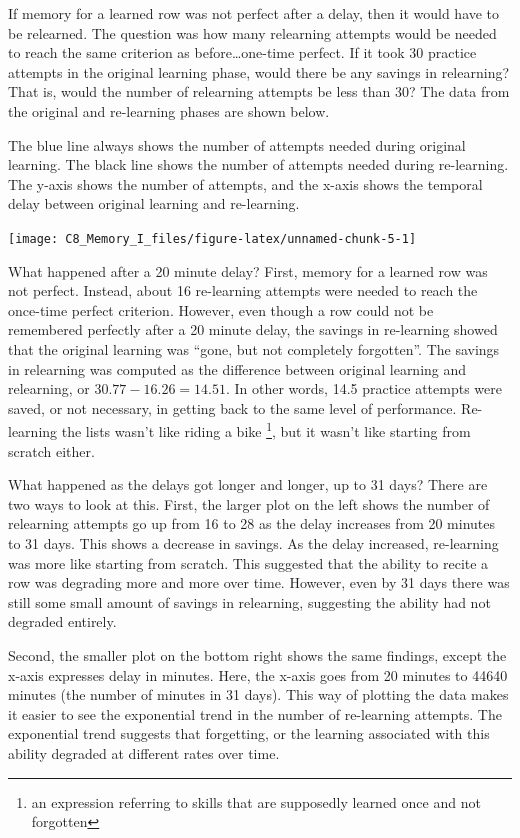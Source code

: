 \documentclass[
  oneside,
  12pt]{crumpbook}
\begin{document}
If memory for a learned row was not perfect after a delay, then it would have to be relearned. The question was how many relearning attempts would be needed to reach the same criterion as before\ldots one-time perfect. If it took 30 practice attempts in the original learning phase, would there be any savings in relearning? That is, would the number of relearning attempts be less than 30? The data from the original and re-learning phases are shown below.

The blue line always shows the number of attempts needed during original learning. The black line shows the number of attempts needed during re-learning. The y-axis shows the number of attempts, and the x-axis shows the temporal delay between original learning and re-learning.

\texttt{[image: C8\_Memory\_I\_files/figure-latex/unnamed-chunk-5-1]}

What happened after a 20 minute delay? First, memory for a learned row was not perfect. Instead, about 16 re-learning attempts were needed to reach the once-time perfect criterion. However, even though a row could not be remembered perfectly after a 20 minute delay, the savings in re-learning showed that the original learning was ``gone, but not completely forgotten''. The savings in relearning was computed as the difference between original learning and relearning, or
\(30.77-16.26 = 14.51\). In other words, 14.5 practice attempts were saved, or not necessary, in getting back to the same level of performance. Re-learning the lists wasn't like riding a bike \footnote{an expression referring to skills that are supposedly learned once and not forgotten}, but it wasn't like starting from scratch either.

What happened as the delays got longer and longer, up to 31 days? There are two ways to look at this. First, the larger plot on the left shows the number of relearning attempts go up from 16 to 28 as the delay increases from 20 minutes to 31 days. This shows a decrease in savings. As the delay increased, re-learning was more like starting from scratch. This suggested that the ability to recite a row was degrading more and more over time. However, even by 31 days there was still some small amount of savings in relearning, suggesting the ability had not degraded entirely.

Second, the smaller plot on the bottom right shows the same findings, except the x-axis expresses delay in minutes. Here, the x-axis goes from 20 minutes to 44640 minutes (the number of minutes in 31 days). This way of plotting the data makes it easier to see the exponential trend in the number of re-learning attempts. The exponential trend suggests that forgetting, or the learning associated with this ability degraded at different rates over time.
\end{document}
